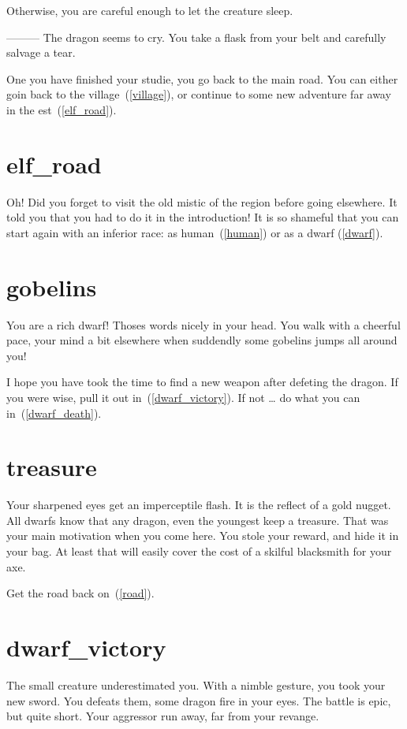 Otherwise, you are careful enough to let the creature sleep.

---------
The dragon seems to cry. You take a flask from your belt and carefully salvage a
tear.

One you have finished your studie, you go back to the main road. You can either
goin back to the village~(\ref{village}), or continue to some new adventure far
away in the est~(\ref{elf_road}).

\section{elf_road}

Oh! Did you forget to visit the old mistic of the region before going elsewhere.
It told you that you had to do it in the introduction! It is so shameful that
you can start again with an inferior race: as human~(\ref{human}) or as a dwarf
(\ref{dwarf}).

\section{gobelins}

You are a rich dwarf! Thoses words nicely in your head. You walk with a cheerful
pace, your mind a bit elsewhere when suddendly some gobelins jumps all around
you!

I hope you have took the time to find a new weapon after defeting the dragon. If
you were wise, pull it out in~(\ref{dwarf_victory}). If not … do what you can
in~(\ref{dwarf_death}).

\section{treasure}

Your sharpened eyes get an imperceptile flash. It is the reflect of a gold
nugget. All dwarfs know that any dragon, even the youngest keep a treasure. That
was your main motivation when you come here. You stole your reward, and hide it
in your bag. At least that will easily cover the cost of a skilful blacksmith
for your axe.

Get the road back on~(\ref{road}).

\section{dwarf_victory}

The small creature underestimated you. With a nimble gesture, you took your new
sword. You defeats them, some dragon fire in your eyes. The battle is epic, but
quite short. Your aggressor run away, far from your revange.

